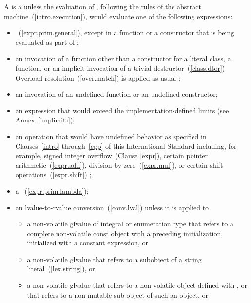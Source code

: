 \pnum
A   is a 
unless the evaluation of , following the rules of the abstract
machine~(\ref{intro.execution}), would evaluate one of the following expressions:

\begin{itemize}
\item
{}~(\ref{expr.prim.general}), except in a 
function or a  constructor that is being evaluated as part
of ;

\item
an invocation of a function other than
a  constructor for a literal class,
a  function,
or an implicit invocation of a trivial destructor~(\ref{class.dtor})
\enternote Overload resolution~(\ref{over.match})
is applied as usual \exitnote;

\item
an invocation of an undefined  function or an
undefined  constructor;

\item
an expression that would exceed the implementation-defined
limits (see Annex~\ref{implimits});

\item
an operation that would have undefined behavior
as specified in Clauses~\ref{intro} through~\ref{cpp}
of this International Standard \enternote including,
for example, signed integer overflow~(Clause \ref{expr}), certain
pointer arithmetic~(\ref{expr.add}), division by
zero~(\ref{expr.mul}), or certain shift operations~(\ref{expr.shift})
\exitnote;

\item
a ~(\ref{expr.prim.lambda});

\item
an lvalue-to-rvalue conversion~(\ref{conv.lval}) unless
it is applied to

\begin{itemize}
  \item
  a non-volatile glvalue of integral or enumeration type that refers
  to a complete non-volatile const object with a preceding initialization,
  initialized with a constant expression, or

  \item
  a non-volatile glvalue that refers to a subobject of a string
  literal~(\ref{lex.string}), or

  \item
  a non-volatile glvalue that refers to a non-volatile object
  defined with , or that refers to a non-mutable sub-object
  of such an object, or


\end{itemize}
\end{itemize}
